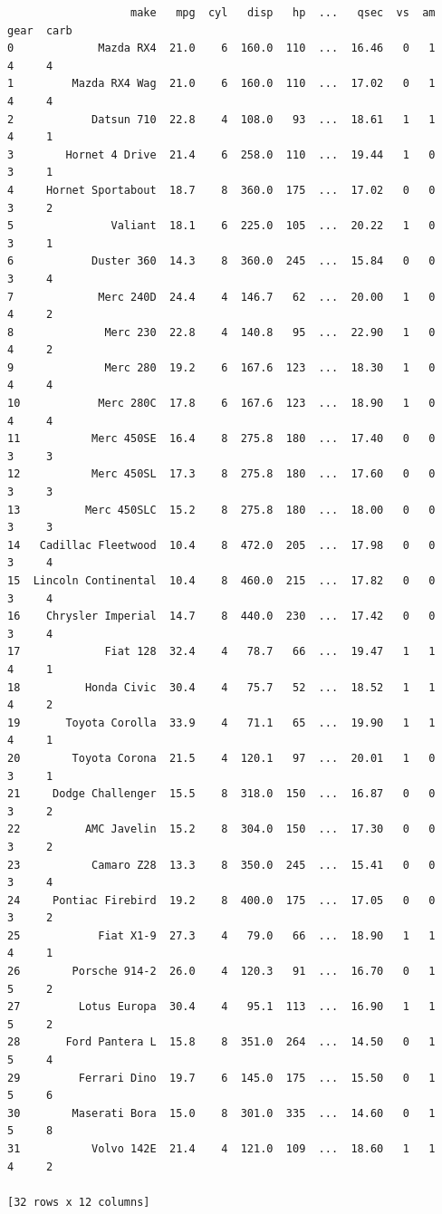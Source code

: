 \documentclass[
  letterpaper,
]{scrbook}
\begin{document}
\begin{verbatim}
                   make   mpg  cyl   disp   hp  ...   qsec  vs  am  gear  carb
0             Mazda RX4  21.0    6  160.0  110  ...  16.46   0   1     4     4
1         Mazda RX4 Wag  21.0    6  160.0  110  ...  17.02   0   1     4     4
2            Datsun 710  22.8    4  108.0   93  ...  18.61   1   1     4     1
3        Hornet 4 Drive  21.4    6  258.0  110  ...  19.44   1   0     3     1
4     Hornet Sportabout  18.7    8  360.0  175  ...  17.02   0   0     3     2
5               Valiant  18.1    6  225.0  105  ...  20.22   1   0     3     1
6            Duster 360  14.3    8  360.0  245  ...  15.84   0   0     3     4
7             Merc 240D  24.4    4  146.7   62  ...  20.00   1   0     4     2
8              Merc 230  22.8    4  140.8   95  ...  22.90   1   0     4     2
9              Merc 280  19.2    6  167.6  123  ...  18.30   1   0     4     4
10            Merc 280C  17.8    6  167.6  123  ...  18.90   1   0     4     4
11           Merc 450SE  16.4    8  275.8  180  ...  17.40   0   0     3     3
12           Merc 450SL  17.3    8  275.8  180  ...  17.60   0   0     3     3
13          Merc 450SLC  15.2    8  275.8  180  ...  18.00   0   0     3     3
14   Cadillac Fleetwood  10.4    8  472.0  205  ...  17.98   0   0     3     4
15  Lincoln Continental  10.4    8  460.0  215  ...  17.82   0   0     3     4
16    Chrysler Imperial  14.7    8  440.0  230  ...  17.42   0   0     3     4
17             Fiat 128  32.4    4   78.7   66  ...  19.47   1   1     4     1
18          Honda Civic  30.4    4   75.7   52  ...  18.52   1   1     4     2
19       Toyota Corolla  33.9    4   71.1   65  ...  19.90   1   1     4     1
20        Toyota Corona  21.5    4  120.1   97  ...  20.01   1   0     3     1
21     Dodge Challenger  15.5    8  318.0  150  ...  16.87   0   0     3     2
22          AMC Javelin  15.2    8  304.0  150  ...  17.30   0   0     3     2
23           Camaro Z28  13.3    8  350.0  245  ...  15.41   0   0     3     4
24     Pontiac Firebird  19.2    8  400.0  175  ...  17.05   0   0     3     2
25            Fiat X1-9  27.3    4   79.0   66  ...  18.90   1   1     4     1
26        Porsche 914-2  26.0    4  120.3   91  ...  16.70   0   1     5     2
27         Lotus Europa  30.4    4   95.1  113  ...  16.90   1   1     5     2
28       Ford Pantera L  15.8    8  351.0  264  ...  14.50   0   1     5     4
29         Ferrari Dino  19.7    6  145.0  175  ...  15.50   0   1     5     6
30        Maserati Bora  15.0    8  301.0  335  ...  14.60   0   1     5     8
31           Volvo 142E  21.4    4  121.0  109  ...  18.60   1   1     4     2

[32 rows x 12 columns]
\end{verbatim}
\end{document}
